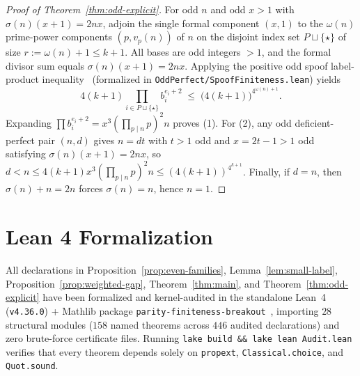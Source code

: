 \documentclass[11pt]{amsart}
\theoremstyle{definition}
\theoremstyle{remark}
\begin{document}
\begin{proof}[Proof of Theorem~\ref{thm:odd-explicit}]
For odd $n$ and odd $x > 1$ with $\sigma(n)(x + 1) = 2nx$, adjoin the single formal component $(x, 1)$ to the $\omega(n)$ prime-power components $(p, v_p(n))$ of $n$ on the disjoint index set $P \sqcup \{\star\}$ of size $r := \omega(n) + 1 \le k + 1$. All bases are odd integers $> 1$, and the formal divisor sum equals $\sigma(n)(x + 1) = 2nx$. Applying the positive odd spoof label-product inequality~\cite[Prop.~4.2, Cor.~4.3]{BYU2022} (formalized in \texttt{OddPerfect/SpoofFiniteness.lean}) yields
\[
  4(k + 1) \prod_{i \in P \sqcup \{\star\}} b_i^{e_i + 2} \;\le\; \bigl(4(k + 1)\bigr)^{4^{\omega(n) + 1}}.
\]
Expanding $\prod b_i^{e_i + 2} = x^3 (\prod_{p \mid n} p)^2 n$ proves (1). For (2), any odd deficient-perfect pair $(n, d)$ gives $n = dt$ with $t > 1$ odd and $x = 2t - 1 > 1$ odd satisfying $\sigma(n)(x + 1) = 2nx$, so $d < n \le 4(k + 1) x^3 (\prod_{p \mid n} p)^2 n \le (4(k + 1))^{4^{k+1}}$. Finally, if $d = n$, then $\sigma(n) + n = 2n$ forces $\sigma(n) = n$, hence $n = 1$.
\end{proof}

\section{Lean 4 Formalization}

All declarations in Proposition~\ref{prop:even-families}, Lemma~\ref{lem:small-label}, Proposition~\ref{prop:weighted-gap}, Theorem~\ref{thm:main}, and Theorem~\ref{thm:odd-explicit} have been formalized and kernel-audited in the standalone Lean~4 (\texttt{v4.36.0}) + Mathlib package \texttt{parity-finiteness-breakout}~\cite{HamiltonParity}, importing $28$ structural modules ($158$ named theorems across $446$ audited declarations) and zero brute-force certificate files. Running \texttt{lake build \&\& lake lean Audit.lean} verifies that every theorem depends solely on \texttt{propext}, \texttt{Classical.choice}, and \texttt{Quot.sound}.
\end{document}
